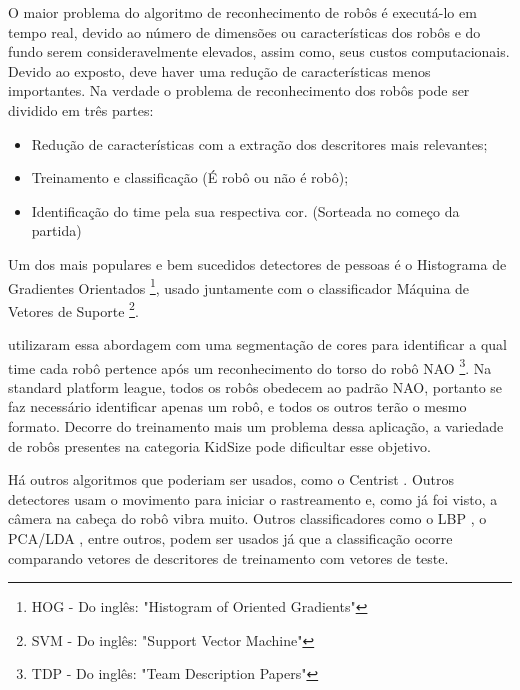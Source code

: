 O maior problema do algoritmo de reconhecimento de robôs é executá-lo em tempo real, devido ao número de dimensões ou características dos robôs e do fundo serem consideravelmente elevados, assim como, seus custos computacionais. Devido ao exposto, deve haver uma redução de características menos importantes. Na verdade o problema de reconhecimento dos robôs pode ser dividido em três partes:

\begin{itemize}
\item{Redução de características com a extração dos descritores mais relevantes;}
\item{Treinamento e classificação (É robô ou não é robô);}
\item{Identificação do time pela sua respectiva cor. (Sorteada no começo da partida)}
\end{itemize}

Um dos mais populares e bem sucedidos detectores de pessoas é o Histograma de Gradientes Orientados  \footnote{HOG - Do inglês: "Histogram of Oriented Gradients"}, usado juntamente com o classificador Máquina de Vetores de Suporte \footnote{SVM - Do inglês: "Support Vector Machine"}.

 utilizaram essa abordagem com uma segmentação de cores para identificar a qual time cada robô pertence após um reconhecimento do torso do robô NAO \cite{NAO}\footnote{TDP - Do inglês: "Team Description Papers"}. Na standard platform league, todos os robôs obedecem ao padrão NAO, portanto se faz necessário identificar apenas um robô, e todos os outros terão o mesmo formato. Decorre do treinamento mais um problema dessa aplicação, a variedade de robôs presentes na categoria KidSize pode dificultar esse objetivo.

Há outros algoritmos que poderiam ser usados, como o Centrist \cite{Wu}. Outros detectores usam o movimento para iniciar o rastreamento e, como já foi visto, a câmera na cabeça do robô vibra muito. Outros classificadores como o LBP \cite{Viola}, o PCA/LDA \cite{Martinez}, entre outros, podem ser usados já que a classificação ocorre comparando vetores de descritores de treinamento com vetores de teste.

